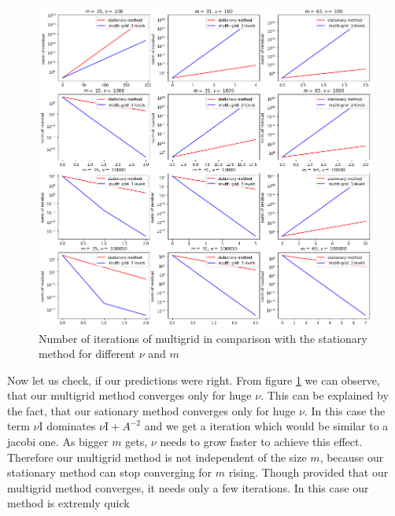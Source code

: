 \documentclass{amsart}
\theoremstyle{definition}
\theoremstyle{remark}
\numberwithin{equation}{section}
\newcommand{\Id}{\mathrm{I}}
\begin{document}
\begin{figure}[h!]
	\centering
	\includegraphics[scale=0.4]{./imgs/multigrid_stat_comparison_tiny}
	\caption{Number of iterations of multigrid in comparison with the stationary method for different $\nu$ and $m$}
	\label{fig: multigridStationary}
\end{figure}
Now let us check, if our predictions were right. From figure \ref{fig: multigridStationary} we can observe, that our multigrid method converges only for huge $\nu $. This can be explained by the fact, that our sationary method converges only for huge $\nu$. In this case the term $\nu \Id$ dominates $\nu \Id + A^{-2}$ and we get a iteration which would be similar to a jacobi one. As bigger $m$ gets, $\nu$ needs to grow faster to achieve this effect. Therefore our multigrid method is not independent of the size $m$, because our stationary method can stop converging for $m$ rising. Though provided that our multigrid method converges, it needs only a few iterations. In this case our method is extremly quick  


\end{document}
